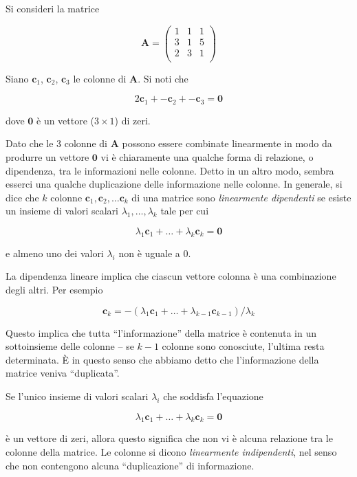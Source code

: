 \documentclass[
  11pt,
]{krantz}
\theoremstyle{definition}
\theoremstyle{definition}
\theoremstyle{definition}
\theoremstyle{definition}
\theoremstyle{remark}
\begin{document}
Si consideri la matrice

\[
\boldsymbol{A}=
\left(%
\begin{array}{ccc}
  1 & 1 & 1 \\
  3 & 1 & 5 \\
  2 & 3 & 1 \\
\end{array}%
\right)
\]

Siano \(\boldsymbol{c}_1\), \(\boldsymbol{c}_2\), \(\boldsymbol{c}_3\) le colonne di \(\boldsymbol{A}\). Si noti che

\[
2\boldsymbol{c}_1 + -\boldsymbol{c}_2 + - \boldsymbol{c}_3 =
\boldsymbol{0}
\]

dove \(\boldsymbol{0}\) è un vettore (\(3 \times 1\)) di zeri.

Dato che le 3 colonne di \(\boldsymbol{A}\) possono essere combinate linearmente in modo da produrre un vettore \(\boldsymbol{0}\) vi è chiaramente una qualche forma di relazione, o dipendenza, tra le informazioni nelle colonne. Detto in un altro modo, sembra esserci una qualche duplicazione delle informazione nelle colonne. In generale, si dice che \(k\) colonne \(\boldsymbol{c}_1, \boldsymbol{c}_2, \dots \boldsymbol{c}_k\) di una matrice sono \emph{linearmente dipendenti} se esiste un insieme di valori scalari \(\lambda_1, \dots, \lambda_k\) tale per cui

\[
\lambda_1 \boldsymbol{c}_1 + \dots + \lambda_k \boldsymbol{c}_k=\boldsymbol{0}
\]

e almeno uno dei valori \(\lambda_i\) non è uguale a 0.

La dipendenza lineare implica che ciascun vettore colonna è una combinazione degli altri. Per esempio

\[
\boldsymbol{c}_k= -(\lambda_1 \boldsymbol{c}_1 + \dots + \lambda_{k-1}
   \boldsymbol{c}_{k-1})/\lambda_k
\]

Questo implica che tutta ``l'informazione'' della matrice è contenuta in un sottoinsieme delle colonne -- se \(k-1\) colonne sono conosciute, l'ultima resta determinata. È in questo senso che abbiamo detto che l'informazione della matrice veniva ``duplicata''.

Se l'unico insieme di valori scalari \(\lambda_i\) che soddisfa l'equazione

\[
\lambda_1 \boldsymbol{c}_1 + \dots + \lambda_k \boldsymbol{c}_k=\boldsymbol{0}
\]

è un vettore di zeri, allora questo significa che non vi è alcuna relazione tra le colonne della matrice. Le colonne si dicono \emph{linearmente indipendenti}, nel senso che non contengono alcuna ``duplicazione'' di informazione.
\end{document}
